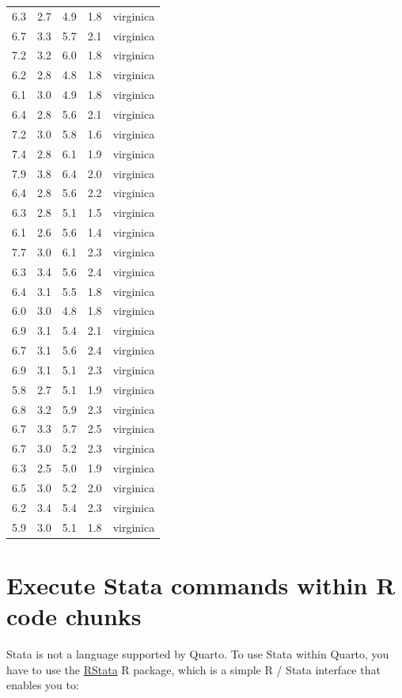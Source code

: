 \documentclass[
  letterpaper,
  DIV=11,
  numbers=noendperiod]{scrreprt}
\begin{document}
\begin{longtable}[]{@{}rrrrl@{}}
6.3 & 2.7 & 4.9 & 1.8 & virginica \\
6.7 & 3.3 & 5.7 & 2.1 & virginica \\
7.2 & 3.2 & 6.0 & 1.8 & virginica \\
6.2 & 2.8 & 4.8 & 1.8 & virginica \\
6.1 & 3.0 & 4.9 & 1.8 & virginica \\
6.4 & 2.8 & 5.6 & 2.1 & virginica \\
7.2 & 3.0 & 5.8 & 1.6 & virginica \\
7.4 & 2.8 & 6.1 & 1.9 & virginica \\
7.9 & 3.8 & 6.4 & 2.0 & virginica \\
6.4 & 2.8 & 5.6 & 2.2 & virginica \\
6.3 & 2.8 & 5.1 & 1.5 & virginica \\
6.1 & 2.6 & 5.6 & 1.4 & virginica \\
7.7 & 3.0 & 6.1 & 2.3 & virginica \\
6.3 & 3.4 & 5.6 & 2.4 & virginica \\
6.4 & 3.1 & 5.5 & 1.8 & virginica \\
6.0 & 3.0 & 4.8 & 1.8 & virginica \\
6.9 & 3.1 & 5.4 & 2.1 & virginica \\
6.7 & 3.1 & 5.6 & 2.4 & virginica \\
6.9 & 3.1 & 5.1 & 2.3 & virginica \\
5.8 & 2.7 & 5.1 & 1.9 & virginica \\
6.8 & 3.2 & 5.9 & 2.3 & virginica \\
6.7 & 3.3 & 5.7 & 2.5 & virginica \\
6.7 & 3.0 & 5.2 & 2.3 & virginica \\
6.3 & 2.5 & 5.0 & 1.9 & virginica \\
6.5 & 3.0 & 5.2 & 2.0 & virginica \\
6.2 & 3.4 & 5.4 & 2.3 & virginica \\
5.9 & 3.0 & 5.1 & 1.8 & virginica \\
\bottomrule()
\end{longtable}

\hypertarget{execute-stata-commands-within-r-code-chunks}{%
\section{Execute Stata commands within R code
chunks}\label{execute-stata-commands-within-r-code-chunks}}

Stata is not a language supported by Quarto. To use Stata within Quarto,
you have to use the
\href{https://cran.r-project.org/web/packages/RStata/README.html}{RStata}
R package, which is a simple R / Stata interface that enables you to:
\end{document}
